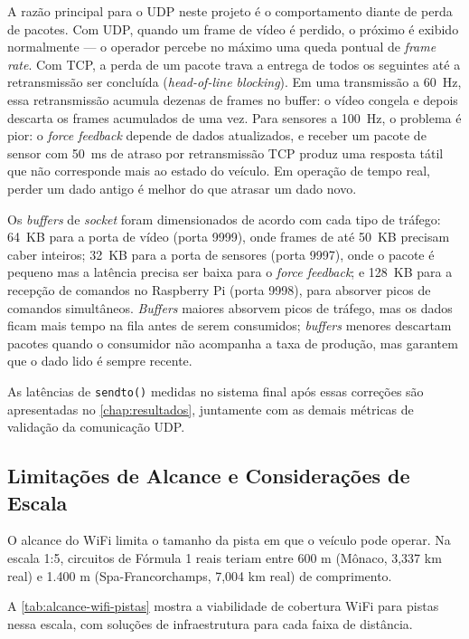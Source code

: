 A razão principal para o \gls{UDP} neste projeto é o comportamento diante de perda de pacotes. Com \gls{UDP}, quando um frame de vídeo é perdido, o próximo é exibido normalmente --- o operador percebe no máximo uma queda pontual de \textit{frame rate}. Com TCP, a perda de um pacote trava a entrega de todos os seguintes até a retransmissão ser concluída (\textit{head-of-line blocking}). Em uma transmissão a 60~Hz, essa retransmissão acumula dezenas de frames no buffer: o vídeo congela e depois descarta os frames acumulados de uma vez. Para sensores a 100~Hz, o problema é pior: o \textit{force feedback} depende de dados atualizados, e receber um pacote de sensor com 50~ms de atraso por retransmissão TCP produz uma resposta tátil que não corresponde mais ao estado do veículo. Em operação de tempo real, perder um dado antigo é melhor do que atrasar um dado novo.

Os \textit{buffers} de \textit{socket} foram dimensionados de acordo com cada tipo de tráfego: 64~KB para a porta de vídeo (porta 9999), onde frames de até 50~KB precisam caber inteiros; 32~KB para a porta de sensores (porta 9997), onde o pacote é pequeno mas a latência precisa ser baixa para o \textit{force feedback}; e 128~KB para a recepção de comandos no Raspberry Pi (porta 9998), para absorver picos de comandos simultâneos. \textit{Buffers} maiores absorvem picos de tráfego, mas os dados ficam mais tempo na fila antes de serem consumidos; \textit{buffers} menores descartam pacotes quando o consumidor não acompanha a taxa de produção, mas garantem que o dado lido é sempre recente.

As latências de \texttt{sendto()} medidas no sistema final após essas correções são apresentadas no \autoref{chap:resultados}, juntamente com as demais métricas de validação da comunicação \gls{UDP}.

\subsection{Limitações de Alcance e Considerações de Escala}
\label{subsec:limitacoes-alcance}

O alcance do WiFi limita o tamanho da pista em que o veículo pode operar. Na escala 1:5, circuitos de Fórmula 1 reais teriam entre 600 m (Mônaco, 3,337 km real) e 1.400 m (Spa-Francorchamps, 7,004 km real) de comprimento.

A \autoref{tab:alcance-wifi-pistas} mostra a viabilidade de cobertura WiFi para pistas nessa escala, com soluções de infraestrutura para cada faixa de distância.

